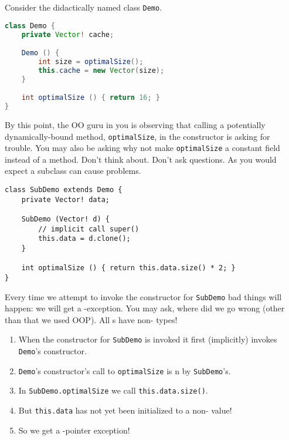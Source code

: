 \documentclass{article}
\begin{document}
\begin{example}
  Consider the didactically named class \texttt{Demo}.
\begin{lstlisting}[language=Java]
class Demo {
    private Vector! cache;

    Demo () {
        int size = optimalSize();
        this.cache = new Vector(size);
    }

    int optimalSize () { return 16; }
}
\end{lstlisting}
  By this point, the OO guru in you is observing that calling a potentially dynamically-bound method, \texttt{optimalSize}, in the constructor is asking for trouble.
  You may also be asking why not make \texttt{optimalSize} a constant field instead of a method.
  Don't think about.
  Don't ask questions.
  As you would expect a subclass can cause problems.
\begin{lstlisting}
class SubDemo extends Demo {
    private Vector! data;

    SubDemo (Vector! d) {
        // implicit call super()
        this.data = d.clone();
    }

    int optimalSize () { return this.data.size() * 2; }
}
\end{lstlisting}
  Every time we attempt to invoke the constructor for \texttt{SubDemo} bad things will happen: we will get a \cringe{}-exception.
  You may ask, where did we go wrong (other than that we used OOP).
  All \receiver{}s have non-\cringe{} types!
  \begin{enumerate}
  \item When the constructor for \texttt{SubDemo} is invoked it first (implicitly) invokes \texttt{Demo}'s constructor.
  \item \texttt{Demo}'s constructor's call to \texttt{optimalSize} is \overide{}n by \texttt{SubDemo}'s.
  \item In \texttt{SubDemo.optimalSize} we call \texttt{this.data.size()}.
  \item But \texttt{this.data} has not yet been initialized to a non-\cringe{} value!
  \item So we get a \cringe{}-pointer exception!
  \end{enumerate}
\end{example}
\end{document}
